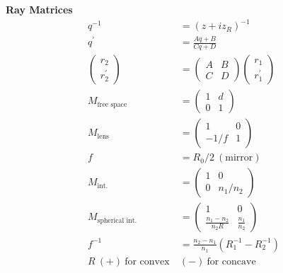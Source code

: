 \documentclass[12pt]{article}
\begin{document}
\begin{multicols}{2}
\textbf{Ray Matrices}
\begin{align}
  q^{-1} &= (z + iz_R)^{-1}\\
  q^{\prime} &= \frac{Aq + B}{Cq + D}\\
  \begin{pmatrix}r_2\\r_2^{\prime}\end{pmatrix} &=
  \begin{pmatrix} A & B\\C & D\end{pmatrix}
  \begin{pmatrix} r_1\\r_1^{\prime}\end{pmatrix}\\
  M_{\textrm{free space}} &= \begin{pmatrix}1 & d\\0 & 1\end{pmatrix}\\
  M_{\textrm{lens}} &= \begin{pmatrix}1 & 0\\-1/f & 1\end{pmatrix}\\
  f &= R_0 / 2 \ (\textrm{mirror})\\
  M_{\textrm{int.}} &= \begin{pmatrix}1 & 0\\0 & n_1/n_2\end{pmatrix}\\
    M_{\textrm{spherical int.}} &= \begin{pmatrix}1 & 0\\
      \frac{n_1 - n_2}{n_2R} & \frac{n_1}{n_2}\end{pmatrix}\\
    f^{-1} &= \frac{n_2 - n_1}{n_1}(R^{-1}_1 - R^{-1}_2)\\
    R \ (+) \ \textrm{for convex} \ &(-) \ \textrm{for concave}
\end{align}


\end{multicols}
\end{document}
